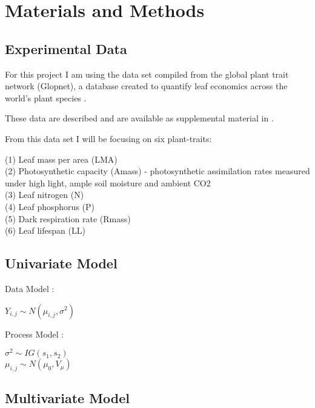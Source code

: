 \documentclass[12pt,fleqn]{article}
\theoremstyle{definition}
\theoremstyle{remark}
\theoremstyle{definition}
\begin{document}
\section{Materials and Methods}

\subsection{Experimental Data}
For this project I am using the data set compiled from the global plant trait network (Glopnet), a database created to quantify leaf economics across the world’s plant species  \citep{Wright}.

 These data are described and are available as supplemental material in \citep{Wright}. 

From this data set I will be focusing on six plant-traits:

(1) Leaf mass per area (LMA)\\
(2) Photosynthetic capacity (Amass) - photosynthetic assimilation rates measured under high light, ample soil moisture and ambient CO2\\
(3) Leaf nitrogen (N) \\
(4) Leaf phosphorus (P)\\
(5) Dark respiration rate (Rmass)  \\
(6) Leaf lifespan (LL) 

\subsection{Univariate Model}

\noindent Data Model :\\
\begin{linenomath*}
$Y_{i,j} \sim N(\mu_{i,j}, \sigma^2) $\\
 \end{linenomath*}

\noindent Process Model :\\
\begin{linenomath*}
$\sigma^2 \sim IG(s_1,s_2)$\\
$\mu_{i,j} \sim N(\mu_0, V_\mu)$\\
 \end{linenomath*}

\subsection{Multivariate Model}
\end{document}
